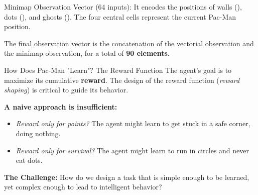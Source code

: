 \begin{frame}{Minimap Observation Vector (64 inputs):}
    It encodes the positions of walls (\small{}\normalsize), dots (\small{}\normalsize), and ghosts (\small{}\normalsize). The four central cells represent the current Pac-Man position.

    \vspace{0.5em}

    The final observation vector is the concatenation of the vectorial observation and the minimap observation, for a total of \textbf{90 elements}.
\end{frame}

\begin{frame}{How Does Pac-Man "Learn"? The Reward Function}
	The agent's goal is to maximize its cumulative \textbf{reward}. The design of the reward function (\textit{reward shaping}) is critical to guide its behavior.
	\vspace{1em}
	
	\textbf{A naive approach is insufficient:}
	\begin{itemize}
		\item \textit{Reward only for points?} The agent might learn to get stuck in a safe corner, doing nothing.
		\item \textit{Reward only for survival?} The agent might learn to run in circles and never eat dots.
	\end{itemize}
	
	\vspace{1em}
	\textbf{The Challenge:} How do we design a task that is simple enough to be learned, yet complex enough to lead to intelligent behavior?
	
\end{frame}


